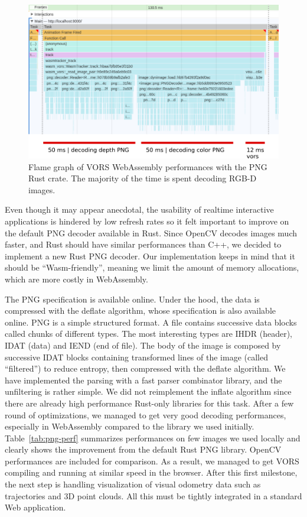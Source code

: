 \begin{figure}[ht]
	\centering
	\includegraphics[width=\linewidth]{assets/img/png-perf-profile-annotated.png}
	\caption{Flame graph of VORS WebAssembly performances with the PNG Rust crate.
	The majority of the time is spent decoding RGB-D images.}%
	\label{fig:png-perf}
\end{figure}

Even though it may appear anecdotal,
the usability of realtime interactive applications
is hindered by low refresh rates so it felt important to improve on the default
PNG decoder available in Rust.
Since OpenCV decodes images much faster,
and Rust should have similar performances than C++,
we decided to implement a new Rust PNG decoder.
Our implementation keeps in mind that it should be ``Wasm-friendly'',
meaning we limit the amount of memory allocations,
which are more costly in WebAssembly.

The PNG specification is available online.
Under the hood, the data is compressed with the deflate algorithm,
whose specification is also available online.
PNG is a simple structured format.
A file contains successive data blocks called chunks of different types.
The most interesting types are IHDR (header), IDAT (data) and IEND (end of file).
The body of the image is composed by successive IDAT blocks
containing transformed lines of the image (called ``filtered'') to reduce entropy,
then compressed with the deflate algorithm.
We have implemented the parsing with a fast parser combinator library,
and the unfiltering is rather simple.
We did not reimplement the inflate algorithm
since there are already high performance Rust-only libraries for this task.
After a few round of optimizations,
we managed to get very good decoding performances,
especially in WebAssembly compared to the library we used initially.
Table~\ref{tab:png-perf} summarizes performances on few images we used locally
and clearly shows the improvement from the default Rust PNG library.
OpenCV performances are included for comparison.
As a result, we managed to get VORS compiling and running at similar speed in the browser.
After this first milestone, the next step is handling visualization
of visual odometry data such as trajectories and 3D point clouds.
All this must be tightly integrated in a standard Web application.

